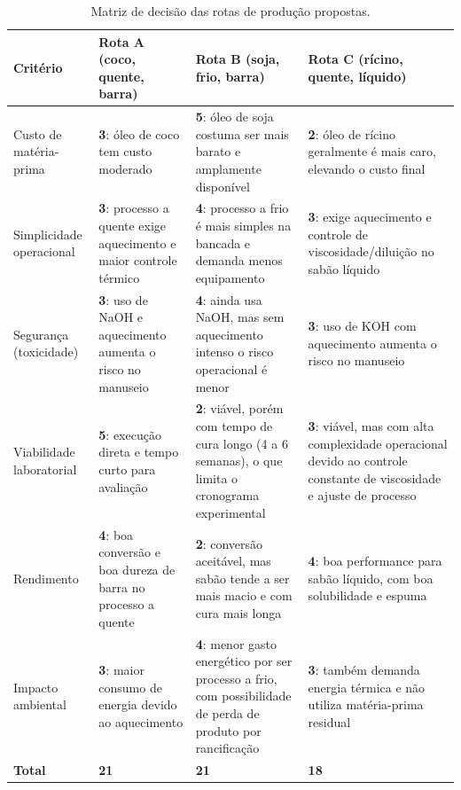 \begin{table}[H]
    \centering
    \footnotesize
    \caption{Matriz de decisão das rotas de produção propostas.}
    \label{tab:matriz_decisao}
    \begin{tabularx}{\textwidth}{>{\raggedright\arraybackslash}p{2.3cm} >{\raggedright\arraybackslash}X >{\raggedright\arraybackslash}X >{\raggedright\arraybackslash}X}
        \toprule
        \textbf{Critério} & \textbf{Rota A} (coco, quente, barra) & \textbf{Rota B} (soja, frio, barra) & \textbf{Rota C} (rícino, quente, líquido) \\
        \midrule
        Custo de matéria-prima & \textbf{3}: óleo de coco tem custo moderado & \textbf{5}: óleo de soja costuma ser mais barato e amplamente disponível & \textbf{2}: óleo de rícino geralmente é mais caro, elevando o custo final \\
        Simplicidade operacional & \textbf{3}: processo a quente exige aquecimento e maior controle térmico & \textbf{4}: processo a frio é mais simples na bancada e demanda menos equipamento & \textbf{3}: exige aquecimento e controle de viscosidade/diluição no sabão líquido \\
        Segurança (toxicidade) & \textbf{3}: uso de NaOH e aquecimento aumenta o risco no manuseio & \textbf{4}: ainda usa NaOH, mas sem aquecimento intenso o risco operacional é menor & \textbf{3}: uso de KOH com aquecimento aumenta o risco no manuseio \\
        Viabilidade laboratorial & \textbf{5}: execução direta e tempo curto para avaliação & \textbf{2}: viável, porém com tempo de cura longo (4 a 6 semanas), o que limita o cronograma experimental & \textbf{3}: viável, mas com alta complexidade operacional devido ao controle constante de viscosidade e ajuste de processo \\
        Rendimento & \textbf{4}: boa conversão e boa dureza de barra no processo a quente & \textbf{2}: conversão aceitável, mas sabão tende a ser mais macio e com cura mais longa & \textbf{4}: boa performance para sabão líquido, com boa solubilidade e espuma \\
        Impacto ambiental & \textbf{3}: maior consumo de energia devido ao aquecimento & \textbf{4}: menor gasto energético por ser processo a frio, com possibilidade de perda de produto por rancificação & \textbf{3}: também demanda energia térmica e não utiliza matéria-prima residual \\
        \midrule
        \textbf{Total} & \textbf{21} & \textbf{21} & \textbf{18} \\
        \bottomrule
    \end{tabularx}
\end{table}

